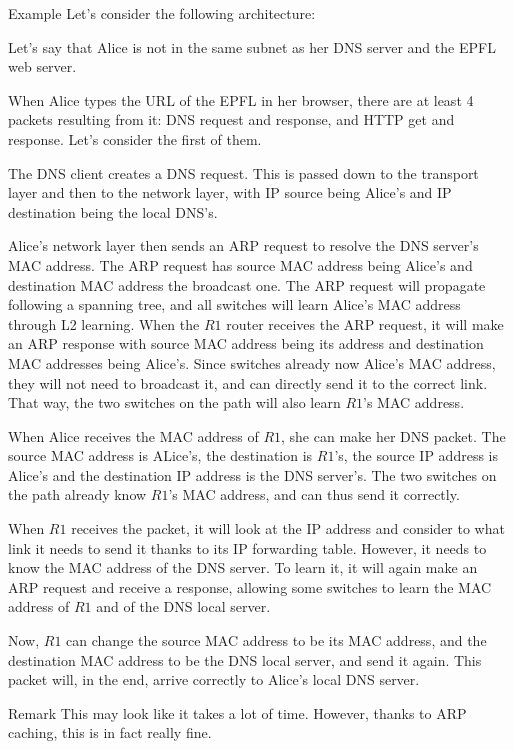 \documentclass[a4paper]{article}
\begin{document}
\begin{parag}{Example}
    Let's consider the following architecture:

    Let's say that Alice is not in the same subnet as her DNS server and the EPFL web server.

    When Alice types the URL of the EPFL in her browser, there are at least 4 packets resulting from it: DNS request and response, and HTTP get and response. Let's consider the first of them. 

    The DNS client creates a DNS request. This is passed down to the transport layer and then to the network layer, with IP source being Alice's and IP destination being the local DNS's.

    Alice's network layer then sends an ARP request to resolve the DNS server's MAC address. The ARP request has source MAC address being Alice's and destination MAC address the broadcast one. The ARP request will propagate following a spanning tree, and all switches will learn Alice's MAC address through L2 learning. When the $R1$ router receives the ARP request, it will make an ARP response with source MAC address being its address and destination MAC addresses being Alice's. Since switches already now Alice's MAC address, they will not need to broadcast it, and can directly send it to the correct link. That way, the two switches on the path will also learn $R1$'s MAC address.

    When Alice receives the MAC address of $R1$, she can make her DNS packet. The source MAC address is ALice's, the destination is $R1$'s, the source IP address is Alice's and the destination IP address is the DNS server's. The two switches on the path already know $R1$'s MAC address, and can thus send it correctly.

    When $R1$ receives the packet, it will look at the IP address and consider to what link it needs to send it thanks to its IP forwarding table. However, it needs to know the MAC address of the DNS server. To learn it, it will again make an ARP request and receive a response, allowing some switches to learn the MAC address of $R1$ and of the DNS local server.

    Now, $R1$ can change the source MAC address to be its MAC address, and the destination MAC address to be the DNS local server, and send it again. This packet will, in the end, arrive correctly to Alice's local DNS server.

    \begin{subparag}{Remark}
        This may look like it takes a lot of time. However, thanks to ARP caching, this is in fact really fine.
    \end{subparag}
\end{parag}
\end{document}
